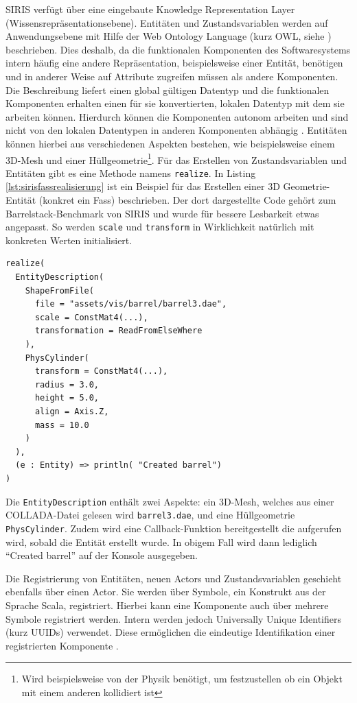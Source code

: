 SIRIS verfügt über eine eingebaute Knowledge Representation Layer (Wissensrepräsentationsebene). Entitäten und Zustandsvariablen werden auf Anwendungsebene mit Hilfe der Web Ontology Language (kurz OWL, siehe \autocite{OWL}) beschrieben. Dies deshalb, da die funktionalen Komponenten des Softwaresystems intern häufig eine andere Repräsentation, beispielsweise einer Entität, benötigen und in anderer Weise auf Attribute zugreifen müssen als andere Komponenten. Die Beschreibung liefert einen global gültigen Datentyp und die funktionalen Komponenten erhalten einen für sie konvertierten, lokalen Datentyp mit dem sie arbeiten können. Hierdurch können die Komponenten autonom arbeiten und sind nicht von den lokalen Datentypen in anderen Komponenten abhängig \autocite[44]{EnhancedDecoupling}. Entitäten können hierbei aus verschiedenen Aspekten bestehen, wie beispielsweise einem 3D-Mesh und einer Hüllgeometrie\footnote{Wird beispielsweise von der Physik benötigt, um festzustellen ob ein Objekt mit einem anderen kollidiert ist}. Für das Erstellen von Zustandsvariablen und Entitäten gibt es eine Methode namens \texttt{realize}. In Listing \ref{lst:sirisfassrealisierung} ist ein Beispiel für das Erstellen einer 3D Geometrie-Entität (konkret ein Fass) beschrieben. Der dort dargestellte Code gehört zum Barrelstack-Benchmark von SIRIS und wurde für bessere Lesbarkeit etwas angepasst. So werden \texttt{scale} und \texttt{transform} in Wirklichkeit natürlich mit konkreten Werten initialisiert.
\lstset{language=Scala}
\begin{lstlisting}[caption={Erstellen einer Entität über eine Entitätsbeschreibung}, label={lst:sirisfassrealisierung}]
realize(
  EntityDescription(
    ShapeFromFile(
      file = "assets/vis/barrel/barrel3.dae",
      scale = ConstMat4(...),
      transformation = ReadFromElseWhere
    ),
    PhysCylinder(
      transform = ConstMat4(...),
      radius = 3.0,
      height = 5.0,
      align = Axis.Z,
      mass = 10.0
    )
  ),
  (e : Entity) => println( "Created barrel")
)
\end{lstlisting}
Die \texttt{EntityDescription} enthält zwei Aspekte: ein 3D-Mesh, welches aus einer COLLADA-Datei gelesen wird \texttt{barrel3.dae}, und eine Hüllgeometrie \texttt{PhysCylinder}. Zudem wird eine Callback-Funktion bereitgestellt die aufgerufen wird, sobald die Entität erstellt wurde. In obigem Fall wird dann lediglich "`Created barrel"' auf der Konsole ausgegeben.

Die Registrierung von Entitäten, neuen Actors und Zustandsvariablen geschieht ebenfalls über einen Actor. Sie werden über Symbole, ein Konstrukt aus der Sprache Scala, registriert. Hierbei kann eine Komponente auch über mehrere Symbole registriert werden. Intern werden jedoch Universally Unique Identifiers (kurz UUIDs) verwendet. Diese ermöglichen die eindeutige Identifikation einer registrierten Komponente \autocite[51]{WorldInterface}.

